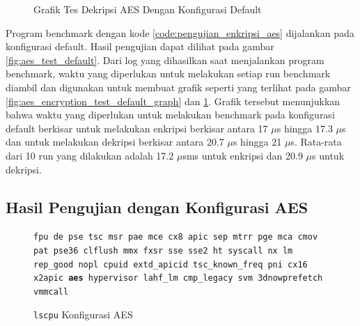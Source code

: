 \begin{figure}
    \centering
    \caption{Grafik Tes Dekripsi AES Dengan Konfigurasi Default}
    \label{fig:aes_decryption_test_default_graph}
\end{figure}

Program benchmark dengan kode \ref{code:pengujian_enkripsi_aes} dijalankan pada konfigurasi default. Hasil pengujian dapat dilihat pada gambar \ref{fig:aes_test_default}. Dari log yang dihasilkan saat menjalankan program benchmark, waktu yang diperlukan untuk melakukan setiap run benchmark diambil dan digunakan untuk membuat grafik seperti yang terlihat pada gambar \ref{fig:aes_encryption_test_default_graph} dan \ref{fig:aes_decryption_test_default_graph}. Grafik tersebut menunjukkan bahwa waktu yang diperlukan untuk melakukan benchmark pada konfigurasi default berkisar untuk melakukan enkripsi berkisar antara 17 $\mu$s hingga 17.3 $\mu$s dan untuk melakukan dekripsi berkisar antara 20.7 $\mu$s hingga 21 $\mu$s. Rata-rata dari 10 run yang dilakukan adalah 17.2 $\mu$sms untuk enkripsi dan 20.9 $\mu$s untuk dekripsi.

\subsection{Hasil Pengujian dengan Konfigurasi AES}
\begin{figure}
    \texttt{fpu de pse tsc msr pae mce cx8 apic sep mtrr pge mca cmov pat pse36 clflush mmx fxsr sse sse2 ht syscall nx lm rep\_good nopl cpuid extd\_apicid tsc\_known\_freq pni cx16 x2apic \textbf{aes} hypervisor lahf\_lm cmp\_legacy svm 3dnowprefetch vmmcall}
    \caption{\texttt{lscpu} Konfigurasi AES}
    \label{fig:lscpu_aes_test_aes}
\end{figure}

